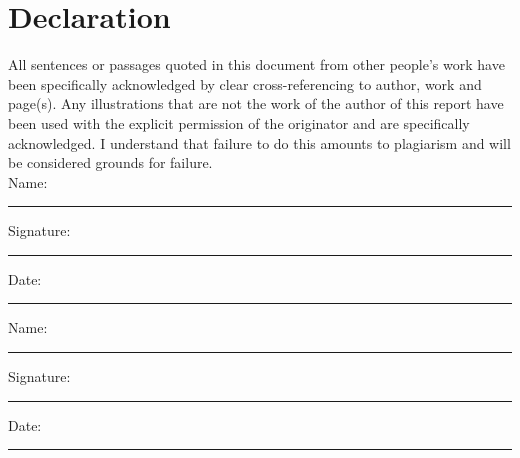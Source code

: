 \documentclass[11pt,oneside]{article}
\begin{document}
\newpage
\section*{\Large Declaration}

All sentences or passages quoted in this document from other people's work have been specifically acknowledged by clear cross-referencing to author, work and page(s).  Any illustrations that are not the work of the author of this report have been used with the explicit permission of the originator and are specifically acknowledged.  I understand that failure to do this amounts to plagiarism and will be considered grounds for failure.\\[1cm]

\noindent Name:\\[1mm]
\rule[1em]{25em}{0.5pt}

\noindent Signature:\\[1mm]
\rule[1em]{25em}{0.5pt}

\noindent Date:\\[1mm]
\rule[1em]{25em}{0.5pt}

\vspace{5cm}

\noindent Name:\\[1mm]
\rule[1em]{25em}{0.5pt}

\noindent Signature:\\[1mm]
\rule[1em]{25em}{0.5pt}

\noindent Date:\\[1mm]
\rule[1em]{25em}{0.5pt}

\newpage
\tableofcontents
\newpage
\listoffigures
\newpage
\listoftables
\newpage












 
 


 \newpage
\begin{appendices}

\end{appendices}
\end{document}
